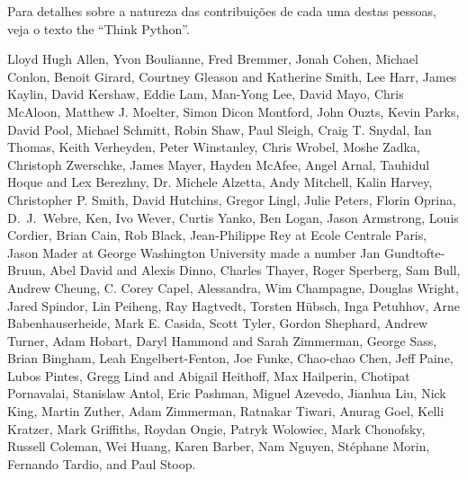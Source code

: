 Para detalhes sobre a natureza das contribuições de cada uma destas pessoas, 
veja o texto the ``Think Python''.

Lloyd Hugh Allen,
Yvon Boulianne,
Fred Bremmer,
Jonah Cohen,
Michael Conlon,
Benoit Girard,
Courtney Gleason and Katherine Smith,
Lee Harr,
James Kaylin,
David Kershaw,
Eddie Lam,
Man-Yong Lee,
David Mayo,
Chris McAloon,
Matthew J. Moelter,
Simon Dicon Montford,
John Ouzts,
Kevin Parks,
David Pool,
Michael Schmitt,
Robin Shaw,
Paul Sleigh,
Craig T. Snydal,
Ian Thomas,
Keith Verheyden,
Peter Winstanley,
Chris Wrobel,
Moshe Zadka,
Christoph Zwerschke,
James Mayer,
Hayden McAfee,
Angel Arnal,
Tauhidul Hoque and Lex Berezhny,
Dr. Michele Alzetta,
Andy Mitchell,
Kalin Harvey,
Christopher P. Smith,
David Hutchins,
Gregor Lingl,
Julie Peters,
Florin Oprina,
D.~J.~Webre,
Ken,
Ivo Wever,
Curtis Yanko,
Ben Logan,
Jason Armstrong,
Louis Cordier,
Brian Cain,
Rob Black,
Jean-Philippe Rey at Ecole Centrale Paris,
Jason Mader at George Washington University made a number
Jan Gundtofte-Bruun,
Abel David and Alexis Dinno,
Charles Thayer,
Roger Sperberg,
Sam Bull,
Andrew Cheung,
C. Corey Capel,
Alessandra,
Wim Champagne,
Douglas Wright,
Jared Spindor,
Lin Peiheng,
Ray Hagtvedt,
Torsten H\"{u}bsch,
Inga Petuhhov,
Arne Babenhauserheide,
Mark E. Casida,
Scott Tyler,
Gordon Shephard,
Andrew Turner,
Adam Hobart,
Daryl Hammond and Sarah Zimmerman,
George Sass,
Brian Bingham,
Leah Engelbert-Fenton,
Joe Funke,
Chao-chao Chen,
Jeff Paine,
Lubos Pintes,
Gregg Lind and Abigail Heithoff,
Max Hailperin,
Chotipat Pornavalai,
Stanislaw Antol,
Eric Pashman,
Miguel Azevedo,
Jianhua Liu,
Nick King,
Martin Zuther,
Adam Zimmerman,
Ratnakar Tiwari,
Anurag Goel,
Kelli Kratzer,
Mark Griffiths,
Roydan Ongie,
Patryk Wolowiec,
Mark Chonofsky,
Russell Coleman,
Wei Huang,
Karen Barber,
Nam Nguyen,
St\'{e}phane Morin,
Fernando Tardio,
and
Paul Stoop.

